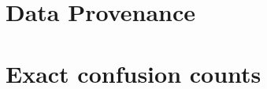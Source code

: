 \documentclass[10pt,a4paper]{article}
\begin{document}
\FloatBarrier\begingroup\footnotesize\setlength{\bibsep}{2pt}
\endgroup
\appendix
\section{Data Provenance}\label{app:provenance}
\begingroup\small\endgroup
\section{Exact confusion counts}\label{app:counts}

\end{document}
